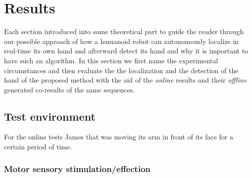 \documentclass[conference]{IEEEtran}
\begin{document}
\section{Results}\label{results}
Each section introduced into some theoretical part to guide the reader through our possible approach of how a humanoid robot can autonomously localize in real-time its own hand and afterward detect its hand and why it is important to have such an algorithm. In this section we first name the experimental circumstances and then evaluate the the localization and the detection of the hand of the proposed method with the aid of the \textit{online} results and their \textit{offline} generated co-results of the same sequences.
%

%
%
\subsection{Test environment}\label{results:testenv}
For the online tests James that was moving its arm in front of its face for a certain period of time. 
%
%
%
\subsubsection{Motor sensory stimulation/effection}\label{results:motosensstim}
\end{document}
